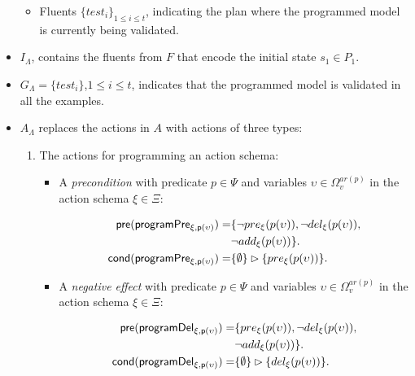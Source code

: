 \documentclass[letterpaper]{article} %
\newcommand{\pre}{\mathsf{pre}}     %
\newcommand{\cond}{\mathsf{cond}}   %
\begin{document}
\begin{itemize}
\begin{itemize}
\item Fluents $\{test_i\}_{1\leq i\leq t}$, indicating the plan where the programmed model is currently being validated.
\end{itemize}
\item $I_{\Lambda}$, contains the fluents from $F$ that encode the initial state $s_1\in P_1$.
\item $G_{\Lambda}=\{test_i\}$,{\small $1\leq i\leq t$}, indicates that the programmed model is validated in all the examples.
\item $A_{\Lambda}$ replaces the actions in $A$ with actions of three types:
\begin{enumerate}
\item The actions for programming an action schema:
\begin{itemize}
\item A {\em precondition} with predicate $p\in\Psi$ and variables $\upsilon\in\Omega_v^{ar(p)}$ in the action schema $\xi\in\Xi$:
\begin{small}
\begin{align*}
\hspace*{7pt}\pre(\mathsf{programPre_{\xi,p(\upsilon)}})=&\{\neg pre_{\xi}(p(\upsilon)),\neg del_{\xi}(p(\upsilon)),\\
                                                     &\neg add_{\xi}(p(\upsilon))\}.\\                     
\cond(\mathsf{programPre_{\xi,p(\upsilon)}})=&\{\emptyset\}\rhd\{pre_{\xi}(p(\upsilon))\}.
\end{align*}
\end{small}
\item A {\em negative effect} with predicate $p\in\Psi$ and variables $\upsilon\in\Omega_v^{ar(p)}$ in the action schema $\xi\in\Xi$:
\begin{small}
\begin{align*}
\hspace*{7pt}\pre(\mathsf{programDel_{\xi,p(\upsilon)}})=&\{pre_{\xi}(p(\upsilon)),\neg del_{\xi}(p(\upsilon)),\\
                                                     &\neg add_{\xi}(p(\upsilon))\}.\\                                                   
\cond(\mathsf{programDel_{\xi,p(\upsilon)}})=&\{\emptyset\}\rhd\{del_{\xi}(p(\upsilon))\}.
\end{align*}
\end{small}


\end{itemize}
\end{enumerate}
\end{itemize}
\end{document}
